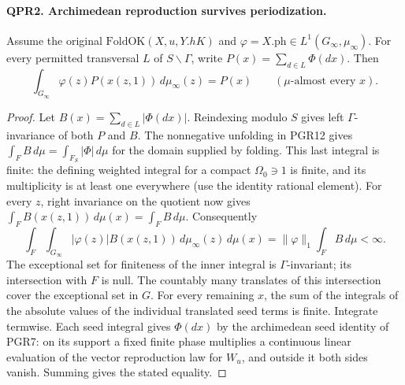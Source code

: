 \paragraph{QPR2. Archimedean reproduction survives periodization.}
Assume the original \(\mathrm{FoldOK}(X,u,Y.hK)\) and
\(\varphi=X.\mathrm{ph}\in L^1(G_\infty,\mu_\infty)\).
For every permitted transversal \(L\) of \(S\backslash\Gamma\),
write \(P(x)=\sum_{d\in L}\Phi(dx)\). Then
\[
 \int_{G_\infty}\varphi(z)P(x(z,1))\,d\mu_\infty(z)=P(x)
 \qquad (\mu\text{-almost every }x).
\]
\begin{proof}
Let \(B(x)=\sum_{d\in L}|\Phi(dx)|\). Reindexing modulo \(S\)
gives left \(\Gamma\)-invariance of both \(P\) and \(B\).
The nonnegative unfolding in PGR12 gives
\(\int_F B\,d\mu=\int_{F_S}|\Phi|\,d\mu\) for the domain supplied
by folding. This last integral is finite: the defining weighted
integral for a compact \(\Omega_0\ni1\) is finite, and its
multiplicity is at least one everywhere (use the identity rational
element). For every \(z\), right invariance on the quotient now gives
\(\int_F B(x(z,1))\,d\mu(x)=\int_F B\,d\mu\).
Consequently
\[
 \int_F\int_{G_\infty}|\varphi(z)|B(x(z,1))\,d\mu_\infty(z)\,d\mu(x)
 =\|\varphi\|_1\int_F B\,d\mu<\infty .
\]
The exceptional set for finiteness of the inner integral is
\(\Gamma\)-invariant; its intersection with \(F\) is null. The
countably many translates of this intersection cover the exceptional
set in \(G\). For every remaining \(x\), the sum of the integrals of
the absolute values of the individual translated seed terms is finite.
Integrate termwise. Each seed integral gives \(\Phi(dx)\) by the
archimedean seed identity of PGR7: on its support a fixed finite
phase multiplies a continuous linear evaluation of the vector
reproduction law for \(W_u\), and outside it both sides vanish.
Summing gives the stated equality.
\end{proof}

